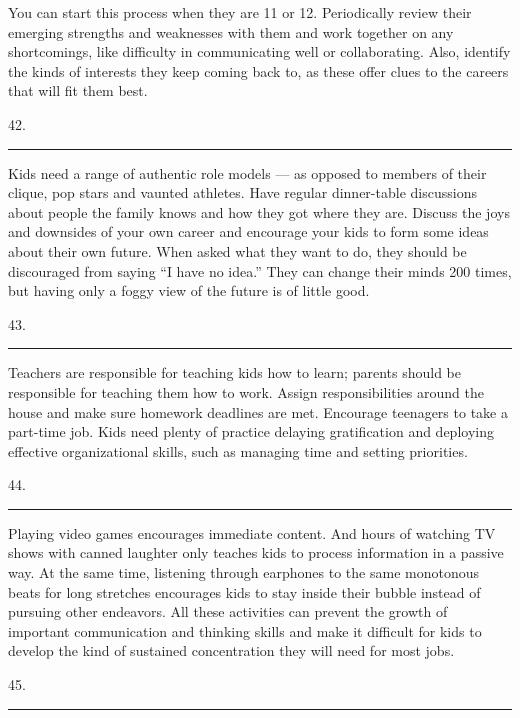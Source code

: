 \documentclass[UTF8,11pt]{ctexart}
\begin{document}
You can start this process when they are 11 or 12. Periodically review their emerging strengths and weaknesses with them and work together on any shortcomings, like difficulty in communicating well or collaborating. Also, identify the kinds of interests they keep coming back to, as these offer clues to the careers that will fit them best.


42. \par\noindent\rule{.95\linewidth}{.4pt}\par


Kids need a range of authentic role models — as opposed to members of their clique, pop stars and vaunted athletes. Have regular dinner-table discussions about people the family knows and how they got where they are. Discuss the joys and downsides of your own career and encourage your kids to form some ideas about their own future. When asked what they want to do, they should be discouraged from saying “I have no idea.” They can change their minds 200 times, but having only a foggy view of the future is of little good.


43. \par\noindent\rule{.95\linewidth}{.4pt}\par


Teachers are responsible for teaching kids how to learn; parents should be responsible for teaching them how to work. Assign responsibilities around the house and make sure homework deadlines are met. Encourage teenagers to take a part-time job. Kids need plenty of practice delaying gratification and deploying effective organizational skills, such as managing time and setting priorities.


44. \par\noindent\rule{.95\linewidth}{.4pt}\par


Playing video games encourages immediate content. And hours of watching TV shows with canned laughter only teaches kids to process information in a passive way. At the same time, listening through earphones to the same monotonous beats for long stretches encourages kids to stay inside their bubble instead of pursuing other endeavors. All these activities can prevent the growth of important communication and thinking skills and make it difficult for kids to develop the kind of sustained concentration they will need for most jobs.


45. \par\noindent\rule{.95\linewidth}{.4pt}\par
\end{document}
